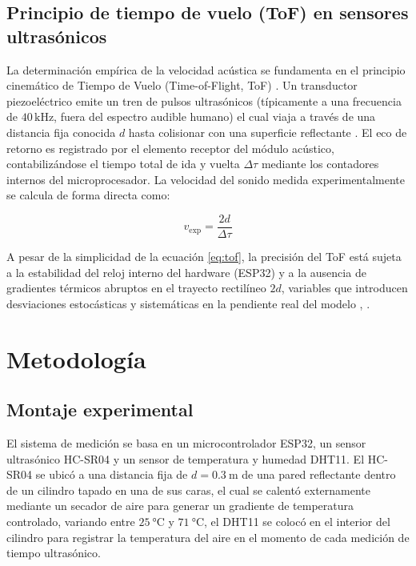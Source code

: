 \documentclass[conference]{IEEEtran}
\begin{document}
\subsection{Principio de tiempo de vuelo (ToF) en sensores ultrasónicos}

La determinación empírica de la velocidad acústica se fundamenta en el principio cinemático de Tiempo de Vuelo (Time-of-Flight, ToF) \cite{dally1993}. Un transductor piezoeléctrico emite un tren de pulsos ultrasónicos (típicamente a una frecuencia de $40\,\text{kHz}$, fuera del espectro audible humano) el cual viaja a través de una distancia fija conocida $d$ hasta colisionar con una superficie reflectante \cite{acebott2024}. El eco de retorno es registrado por el elemento receptor del módulo acústico, contabilizándose el tiempo total de ida y vuelta $\Delta \tau$ mediante los contadores internos del microprocesador. La velocidad del sonido medida experimentalmente se calcula de forma directa como:

\begin{equation}
v_{\text{exp}} = \frac{2d}{\Delta \tau}
\label{eq:tof}
\end{equation}

A pesar de la simplicidad de la ecuación \eqref{eq:tof}, la precisión del ToF está sujeta a la estabilidad del reloj interno del hardware (ESP32) y a la ausencia de gradientes térmicos abruptos en el trayecto rectilíneo $2d$, variables que introducen desviaciones estocásticas y sistemáticas en la pendiente real del modelo \cite{dally1993}, \cite{montgomery2012}.
\section{Metodología}

\subsection{Montaje experimental}

El sistema de medición se basa en un microcontrolador ESP32, un sensor ultrasónico HC-SR04 y un sensor de temperatura y humedad DHT11. El HC-SR04 se ubicó a una distancia fija de 
$d = \SI{0.3}{\meter}$ 
de una pared reflectante dentro de un cilindro tapado en una de sus caras, el cual se calentó externamente mediante un secador de aire para generar un gradiente de temperatura controlado, variando entre 
$\SI{25}{\celsius}$ y $\SI{71}{\celsius}$, el DHT11 se colocó en el interior del cilindro para registrar la temperatura del aire en el momento de cada medición de tiempo ultrasónico.
\end{document}
